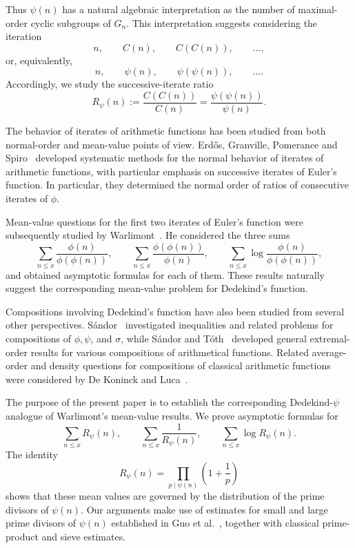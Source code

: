 \documentclass{article}
\theoremstyle{remark}
\begin{document}
Thus \(\psi(n)\) has a natural algebraic interpretation as the number
of maximal-order cyclic subgroups of \(G_n\). This interpretation
suggests considering the iteration
\[
n,\qquad C(n),\qquad C(C(n)),\qquad\ldots,
\]
or, equivalently,
\[
n,\qquad \psi(n),\qquad \psi(\psi(n)),\qquad\ldots.
\]
Accordingly, we study the successive-iterate ratio
\[
R_\psi(n)
:=
\frac{C(C(n))}{C(n)}
=
\frac{\psi(\psi(n))}{\psi(n)}.
\]

The behavior of iterates of arithmetic functions has been studied from
both normal-order and mean-value points of view. Erd\H{o}s, Granville,
Pomerance and Spiro~\cite{EGPS} developed systematic methods for the
normal behavior of iterates of arithmetic functions, with particular
emphasis on successive iterates of Euler's function. In particular,
they determined the normal order of ratios of consecutive iterates of
\(\phi\).

Mean-value questions for the first two iterates of Euler's function
were subsequently studied by Warlimont~\cite{Warlimont}. He considered
the three sums
\[
\sum_{n\le x}\frac{\phi(n)}{\phi(\phi(n))},
\qquad
\sum_{n\le x}\frac{\phi(\phi(n))}{\phi(n)},
\qquad
\sum_{n\le x}\log\frac{\phi(n)}{\phi(\phi(n))},
\]
and obtained asymptotic formulas for each of them. These results
naturally suggest the corresponding mean-value problem for Dedekind's
function.

Compositions involving Dedekind's function have also been studied from
several other perspectives. S\'andor~\cite{Sandor2005} investigated
inequalities and related problems for compositions of
\(\phi,\psi\), and \(\sigma\), while S\'andor and
T\'oth~\cite{SandorToth} developed general extremal-order results for
various compositions of arithmetical functions. Related average-order
and density questions for compositions of classical arithmetic
functions were considered by De Koninck and Luca~\cite{DeKoninckLuca}.


The purpose of the present paper is to establish the corresponding
Dedekind-\(\psi\) analogue of Warlimont's mean-value results.
 We prove asymptotic formulas for
\[
\sum_{n\le x}R_\psi(n),\qquad
\sum_{n\le x}\frac1{R_\psi(n)},\qquad
\sum_{n\le x}\log R_\psi(n).
\]
The identity
\[
R_\psi(n)
=
\prod_{p\mid\psi(n)}
\left(1+\frac1p\right)
\]
shows that these mean values are governed by the distribution of the
prime divisors of \(\psi(n)\). Our arguments make use of estimates for
small and large prime divisors of \(\psi(n)\) established in
Guo et al.~\cite{Guo}, together with classical prime-product and sieve
estimates.
\end{document}
